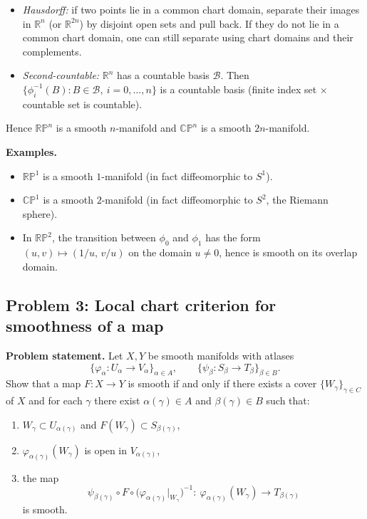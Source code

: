 \documentclass[12pt,a4paper]{article}
\theoremstyle{plain}
\theoremstyle{definition}      %
\begin{document}
\begin{itemize}
	\item \emph{Hausdorff:} if two points lie in a common chart domain, separate their images in $\mathbb R^n$ (or $\mathbb R^{2n}$) by disjoint open sets
	and pull back. If they do not lie in a common chart domain, one can still separate using chart domains and their complements.
	\item \emph{Second-countable:} $\mathbb R^n$ has a countable basis $\mathcal B$. Then
	$\{\phi_i^{-1}(B): B\in\mathcal B,\ i=0,\dots,n\}$ is a countable basis (finite index set $\times$ countable set is countable).
\end{itemize}
Hence $\mathbb{RP}^n$ is a smooth $n$-manifold and $\mathbb{CP}^n$ is a smooth $2n$-manifold.

\medskip
\noindent\textbf{Examples.}
\begin{itemize}
	\item $\mathbb{RP}^1$ is a smooth $1$-manifold (in fact diffeomorphic to $S^1$).
	\item $\mathbb{CP}^1$ is a smooth $2$-manifold (in fact diffeomorphic to $S^2$, the Riemann sphere).
	\item In $\mathbb{RP}^2$, the transition between $\phi_0$ and $\phi_1$ has the form $(u,v)\mapsto (1/u,\,v/u)$ on the domain $u\neq 0$,
	hence is smooth on its overlap domain.
\end{itemize}



\subsection*{Problem 3: Local chart criterion for smoothness of a map}

\noindent\textbf{Problem statement.}
Let $X,Y$ be smooth manifolds with atlases
\[
\{\varphi_\alpha:U_\alpha\to V_\alpha\}_{\alpha\in A},
\qquad
\{\psi_\beta:S_\beta\to T_\beta\}_{\beta\in B}.
\]
Show that a map $F:X\to Y$ is smooth if and only if there exists a cover $\{W_\gamma\}_{\gamma\in C}$ of $X$ and
for each $\gamma$ there exist $\alpha(\gamma)\in A$ and $\beta(\gamma)\in B$ such that:
\begin{enumerate}
	\item[(a)] $W_\gamma\subset U_{\alpha(\gamma)}$ and $F(W_\gamma)\subset S_{\beta(\gamma)}$,
	\item[(b)] $\varphi_{\alpha(\gamma)}(W_\gamma)$ is open in $V_{\alpha(\gamma)}$,
	\item[(c)] the map
	\[
	\psi_{\beta(\gamma)}\circ F\circ \big(\varphi_{\alpha(\gamma)}\vert_{W_\gamma}\big)^{-1}
	:\ \varphi_{\alpha(\gamma)}(W_\gamma)\longrightarrow T_{\beta(\gamma)}
	\]
	is smooth.
\end{enumerate}
\end{document}
